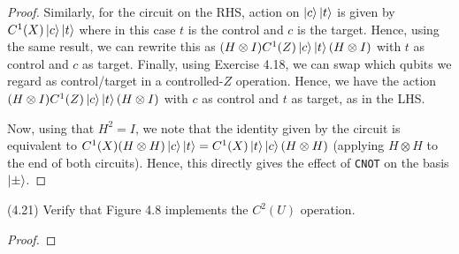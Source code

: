 \documentclass[main.tex]{subfiles}
\begin{document}
\begin{subappendices}
\begin{exercise}
\begin{proof}
Similarly, for the circuit on the RHS, action on $\ket{c}\ket{t}$ is given by $C^1(X)\ket{c}\ket{t}$ where in this case $t$ is the control and $c$ is the target. Hence, using the same result, we can rewrite this as $(H \otimes I) C^1(Z)\ket{c}\ket{t} (H \otimes I)$ with $t$ as control and $c$ as target. Finally, using Exercise 4.18, we can swap which qubits we regard as control/target in a controlled-$Z$ operation. Hence, we have the action $(H \otimes I) C^1(Z)\ket{c}\ket{t} (H \otimes I)$ with $c$ as control and $t$ as target, as in the LHS. 

Now, using that $H^2 = I$, we note that the identity given by the circuit is equivalent to $C^1(X) (H \otimes H)\ket{c}\ket{t} = C^1(X) \ket{t}\ket{c} (H \otimes H)$ (applying $H \otimes H$ to the end of both circuits). Hence, this directly gives the effect of \texttt{CNOT} on the basis $\ket{\pm}$. 

\end{proof}

\end{exercise}

\begin{exercise}(4.21) Verify that Figure 4.8 implements the $C^2(U)$ operation.
	
	\begin{proof}
		
	\end{proof}

\end{exercise}


\end{subappendices}
\end{document}

